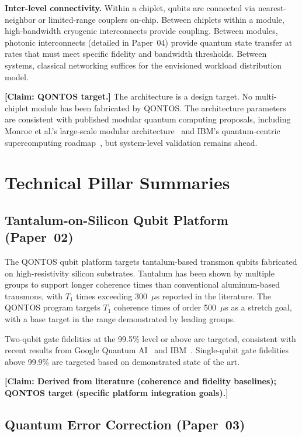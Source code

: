 \documentclass[conference]{IEEEtran}
\begin{document}
\textbf{Inter-level connectivity.} Within a chiplet, qubits are connected via nearest-neighbor or limited-range couplers on-chip. Between chiplets within a module, high-bandwidth cryogenic interconnects provide coupling. Between modules, photonic interconnects (detailed in Paper~04) provide quantum state transfer at rates that must meet specific fidelity and bandwidth thresholds. Between systems, classical networking suffices for the envisioned workload distribution model.

\textbf{[Claim: QONTOS target.]} The architecture is a design target. No multi-chiplet module has been fabricated by QONTOS. The architecture parameters are consistent with published modular quantum computing proposals, including Monroe et al.'s large-scale modular architecture~\cite{monroe2014} and IBM's quantum-centric supercomputing roadmap~\cite{ibm2024}, but system-level validation remains ahead.

\section{Technical Pillar Summaries}

\subsection{Tantalum-on-Silicon Qubit Platform (Paper~02)}

The QONTOS qubit platform targets tantalum-based transmon qubits fabricated on high-resistivity silicon substrates. Tantalum has been shown by multiple groups to support longer coherence times than conventional aluminum-based transmons, with $T_1$ times exceeding 300~$\mu$s reported in the literature. The QONTOS program targets $T_1$ coherence times of order 500~$\mu$s as a stretch goal, with a base target in the range demonstrated by leading groups.

Two-qubit gate fidelities at the 99.5\% level or above are targeted, consistent with recent results from Google Quantum AI~\cite{googleqai2024} and IBM~\cite{ibm2024}. Single-qubit gate fidelities above 99.9\% are targeted based on demonstrated state of the art.

\textbf{[Claim: Derived from literature (coherence and fidelity baselines); QONTOS target (specific platform integration goals).]}

\subsection{Quantum Error Correction (Paper~03)}
\end{document}

